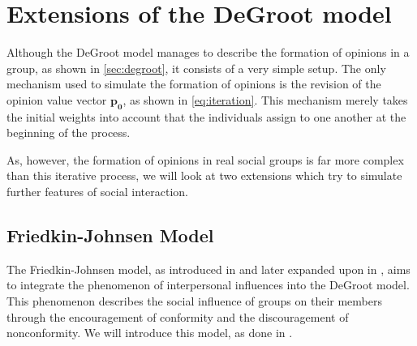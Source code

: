 \documentclass[journal,compsoc,10pt]{IEEEtran}
\newcommand{\gG}{\mathcal{G}}
\renewcommand{\vec}[1]{\bm{#1}}        %
\newcommand{\mat}[1]{\bm{#1}}          %
\newtheorem{theorem}{Theorem}[section]
\begin{document}



\section{Extensions of the DeGroot model}\label{sec:extensions}
Although the DeGroot model manages to describe the formation of opinions in a group, as shown in \cref{sec:degroot}, it consists of a very simple setup. The only mechanism used to simulate the formation of opinions is the revision of the opinion value vector $\vec{p_0}$, as shown in \cref{eq:iteration}. This mechanism merely takes the initial weights into account that the individuals assign to one another at the beginning of the process.

As, however, the formation of opinions in real social groups is far more complex than this iterative process, we will look at two extensions which try to simulate further features of social interaction. 

\subsection{Friedkin-Johnsen Model}\label{sec:friedkin-johnsen}
The Friedkin-Johnsen model, as introduced in \cite{Friedkin01011990} and later expanded upon in \cite{article}, aims to integrate the phenomenon of interpersonal influences into the DeGroot model. This phenomenon describes the social influence of groups on their members through the encouragement of conformity and the discouragement of nonconformity. We will introduce this model, as done in \cite{article}.
\end{document}
